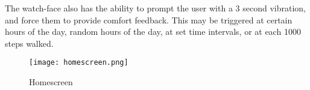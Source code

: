 The watch-face also has the ability to prompt the user with a 3 second vibration, and force them to provide comfort feedback. This may be triggered at certain hours of the day, random hours of the day, at set time intervals, or at each 1000 steps walked. 


\begin{figure}
\begin{center}
\texttt{[image: homescreen.png]}
\caption{Homescreen}
\label{fig:homescreen}
\end{center}
\end{figure}



